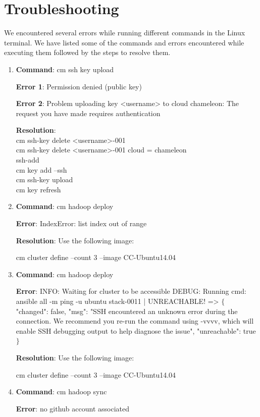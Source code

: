 \documentclass[9pt,twocolumn,twoside]{../../styles/osajnl}
\begin{document}
\section{Troubleshooting}
We encountered several errors while running different commands in the Linux terminal. We have listed some of the commands and errors encountered while executing them followed by the steps to resolve them.
\begin{enumerate}
 \item \textbf{Command}: cm ssh key upload
 
 \textbf{Error 1}: Permission denied (public key)
 
 \textbf{Error 2}: Problem uploading key <username> to cloud chameleon:
 The request you have made requires authentication
 
 \textbf{Resolution}: \\
 cm ssh-key delete <username>-001\\
 cm ssh-key delete <username>-001 cloud = chameleon\\
 ssh-add\\
 cm key add --ssh\\
 cm ssh-key upload\\
 cm key refresh
 
 \item \textbf{Command}: cm hadoop deploy
 
 \textbf{Error}: IndexError: list index out of range

 \textbf{Resolution}: Use the following image:
 
cm cluster define --count 3 --image CC-Ubuntu14.04

\item \textbf{Command}: cm hadoop deploy

 \textbf{Error}: INFO: Waiting for cluster to be accessible
DEBUG: Running cmd: ansible all -m ping -u ubuntu
stack-0011 | UNREACHABLE! => $\{$
"changed": false, 
"msg": "SSH encountered an unknown error during the 
connection. We recommend you re-run the command using 
-vvvv, which will enable SSH debugging output to help 
diagnose the issue", 
"unreachable": true
$\}$

\textbf{Resolution}: Use the following image:

cm cluster define --count 3 --image CC-Ubuntu14.04


 \item \textbf{Command}: cm hadoop sync
 
 \textbf{Error}: no github account associated
 

\end{enumerate}
\end{document}

